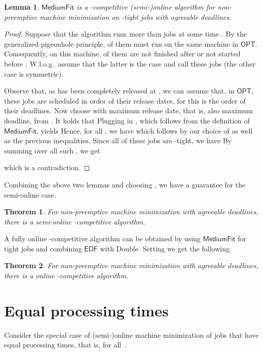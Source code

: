 \documentclass[letterpaper,11pt]{article}
\newtheorem{theorem}{Theorem}
\newtheorem{lemma}{Lemma}
\newcommand{\EDF}{\ensuremath{\mathsf{EDF}}\xspace}
\newcommand{\OPT}{\ensuremath{\mathsf{OPT}}\xspace}
\newcommand{\Mediumfit}{\ensuremath{\mathsf{MediumFit}}\xspace}
\newcommand{\double}{{\sf Double}\xspace}
\begin{document}
\begin{lemma}\label{lemma:agreeable-medium-fit}
\Mediumfit is a -competitive (semi-)online algorithm for non-preemptive machine minimization on -tight jobs with agreeable deadlines.
\end{lemma}  
\begin{proof}
Suppose that the algorithm runs more than  jobs at some time . By the generalized pigeonhole principle,  of them must run on the same machine in \OPT. Consequently, on this machine,  of them are not finished after or not started before . W.l.o.g.~assume that the latter is the case and call these jobs  (the other case is symmetric).

Observe that, as  has been completely released at , we can assume that, in \OPT, these jobs are scheduled in order of their release dates, for this is the order of their deadlines. Now choose  with maximum release date, that is, also maximum deadline, from . It holds that  Plugging in , which follows from the definition of \Mediumfit, yields  Hence, for all , we have  which follows by our choice of  as well as the previous inequalities. Since all of these jobs are -tight, we have  By summing over all such , we get 

which is a contradiction.
\end{proof}

Combining the above two lemmas and choosing , we have a guarantee for the semi-online case.

\begin{theorem}
  For non-preemptive machine minimization with agreeable deadlines, there is a semi-online -competitive algorithm.
\end{theorem}

A fully online -competitive algorithm can be obtained by using \Mediumfit for tight jobs and combining \EDF with \double. Setting  we get the following.

\begin{theorem}
  For non-preemptive machine minimization with agreeable deadlines, there is a online -competitive algorithm.
\end{theorem}

\section{Equal processing times}
\label{sec:special-cases2}

Consider the special case of (semi-)online machine minimization of jobs that have equal processing times, that is,  for all~.
\end{document}
